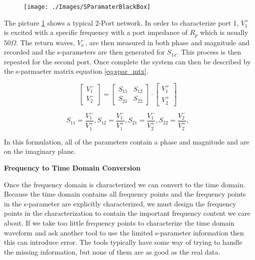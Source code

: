 \documentclass{book}
\begin{document}
\begin{figure}
\centering
\texttt{[image: ./Images/SParamaterBlackBox]}
\caption{}
\label{fig:SParamaterBlackBox}
\end{figure}

The picture \ref{fig:SParamaterBlackBox} shows a typical 2-Port network.  In order to characterize port 1, $V_{1}^{+}$ is excited with a specific frequency with a port impedance of $R_{p}$ which is usually $50 \Omega $.  The return waves, $V_{x}^{-}$, are then measured in both phase and magnitude and recorded and the s-parameters are then generated for $S_{1x}$. This process is then repeated for the second port. Once complete the system can then be described by the s-parmaeter matrix equation \ref{eq:spar_mtx}.

\begin{equation} \label{eq:spar_mtx}
\begin{bmatrix} 
V_{1}^{-} \\  V_{2}^{-}
\end{bmatrix}
=
\begin{bmatrix} 
S_{11} & S_{12} \\ 
S_{21} & S_{22} 
\end{bmatrix}
\cdot
\begin{bmatrix} 
V_{1}^{+} \\  V_{2}^{+}
\end{bmatrix}
\end{equation}

\begin{equation} 
S_{11} = \frac{V_{1}^{-}}{V_{1}^{+}}, 
S_{12} = \frac{V_{1}^{-}}{V_{1}^{+}},
S_{21} = \frac{V_{1}^{-}}{V_{2}^{+}},
S_{22} = \frac{V_{2}^{-}}{V_{2}^{+}},
\end{equation}

In this formulation, all of the parameters contain a phase and magnitude and are on the imaginary plane.  

\textbf{Frequency to Time Domain Conversion}

Once the frequency domain is characterized we can convert to the time domain.  Because the time domain contains all frequency points and the frequency points in the s-parameter are explicitly characterized, we must design the frequency points in the characterization to contain the important frequency content we care about.  If we take too little frequency points to characterize the time domain waveform and ask another tool to use the limited s-parameter information then this can introduce error.  The tools typically have some way of trying to handle the missing information, but none of them are as good as the real data.
\end{document}
